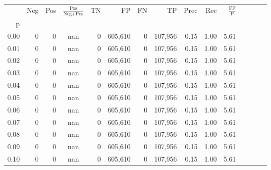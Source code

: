 \begin{tabular}{rrrcrrrrrrrrrrr}
\toprule
{} &     Neg &    Pos & $\frac{\text{Pos}}{\text{Neg}+\text{Pos}}$ &       TN &       FP &       FN &       TP &  Prec &   Rec & $\frac{\text{FP}}{\text{P}}$ \\
p    &         &        &                                            &          &          &          &          &       &       &                              \\
\midrule
0.00 &       0 &      0 &                                        nan &        0 &  605,610 &        0 &  107,956 &  0.15 &  1.00 &                         5.61 \\
0.01 &       0 &      0 &                                        nan &        0 &  605,610 &        0 &  107,956 &  0.15 &  1.00 &                         5.61 \\
0.02 &       0 &      0 &                                        nan &        0 &  605,610 &        0 &  107,956 &  0.15 &  1.00 &                         5.61 \\
0.03 &       0 &      0 &                                        nan &        0 &  605,610 &        0 &  107,956 &  0.15 &  1.00 &                         5.61 \\
0.04 &       0 &      0 &                                        nan &        0 &  605,610 &        0 &  107,956 &  0.15 &  1.00 &                         5.61 \\
0.05 &       0 &      0 &                                        nan &        0 &  605,610 &        0 &  107,956 &  0.15 &  1.00 &                         5.61 \\
0.06 &       0 &      0 &                                        nan &        0 &  605,610 &        0 &  107,956 &  0.15 &  1.00 &                         5.61 \\
0.07 &       0 &      0 &                                        nan &        0 &  605,610 &        0 &  107,956 &  0.15 &  1.00 &                         5.61 \\
0.08 &       0 &      0 &                                        nan &        0 &  605,610 &        0 &  107,956 &  0.15 &  1.00 &                         5.61 \\
0.09 &       0 &      0 &                                        nan &        0 &  605,610 &        0 &  107,956 &  0.15 &  1.00 &                         5.61 \\
0.10 &       0 &      0 &                                        nan &        0 &  605,610 &        0 &  107,956 &  0.15 &  1.00 &                         5.61 \\

\end{tabular}
